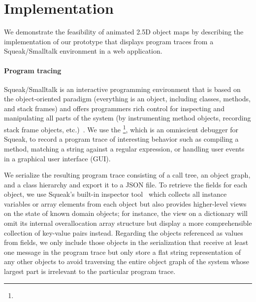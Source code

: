 \section{Implementation}
\label{sec:implementation}

We demonstrate the feasibility of animated 2.5D object maps by describing the implementation of our prototype \tfd{} that displays program traces from a Squeak/Smalltalk environment in a web application.

\paragraph{Program tracing}
\label{sec:implementation/program_tracing}

Squeak/Smalltalk is an interactive programming environment that is based on the object-oriented paradigm (everything is an object, including classes, methods, and stack frames) and offers programmers rich control for inspecting and manipulating all parts of the system (by instrumenting method objects, recording stack frame objects, etc.)~\cite{ingalls1997back,rowledge2001tour,thiede2023squeak}.
We use the \tdb{}\footnote{}, which is an omniscient debugger for Squeak, to record a program trace of interesting behavior such as compiling a method, matching a string against a regular expression, or handling user events in a graphical user interface (GUI).

We serialize the resulting program trace consisting of a call tree, an object graph, and a class hierarchy and export it to a JSON file.
To retrieve the fields for each object, we use Squeak's built-in inspector tool~\cite[chap. 6, sec. 3]{thiede2023squeak} which collects all instance variables or array elements from each object but also provides higher-level views on the state of known domain objects; for instance, the view on a dictionary will omit its internal overallocation array structure but display a more comprehensible collection of key-value pairs instead.
Regarding the objects referenced as values from fields, we only include those objects in the serialization that receive at least one message in the program trace but only store a flat string representation of any other objects to avoid traversing the entire object graph of the system whose largest part is irrelevant to the particular program trace.

